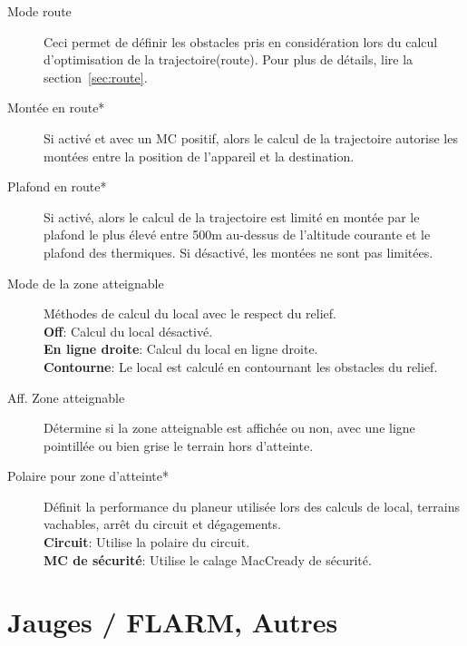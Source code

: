 \begin{description}
\item[Mode route]  \label{conf:routemode} Ceci permet de définir les obstacles pris en considération lors du calcul d'optimisation de la trajectoire(route). Pour plus de détails, lire la section~\ref{sec:route}.
\item[Montée en route*]  \label{conf:routeclimb} Si activé et avec un MC positif, alors le calcul de la trajectoire autorise les montées entre la position de l'appareil et la destination.
\item[Plafond en route*]  \label{conf:routeceiling} Si activé, alors le calcul de la trajectoire est limité en montée par le plafond le plus élevé entre 500m au-dessus de l'altitude courante et le plafond des thermiques. Si désactivé, les montées ne sont pas limitées.\\
\item[Mode de la zone atteignable]  \label{conf:turningreach} Méthodes de calcul du local avec le respect du relief.\\
  {\bf Off}: Calcul du local désactivé. \\
  {\bf En ligne droite}: Calcul du local en ligne droite. \\
  {\bf Contourne}: Le local est calculé en contournant les obstacles du relief.
\item[Aff. Zone atteignable]  \label{conf:gliderange} Détermine si la zone atteignable est affichée ou non, avec une ligne pointillée ou bien grise le terrain hors d'atteinte.
\item[Polaire pour zone d'atteinte*]  \label{conf:reachpolar} Définit la performance du planeur utilisée lors des calculs de local, terrains vachables, arrêt du circuit et dégagements. \\
  {\bf Circuit}: Utilise la polaire du circuit. \\
  {\bf MC de sécurité}: Utilise le calage MacCready de sécurité.
\end{description}


\section{Jauges / FLARM, Autres} \label{sec:flarmandother-gauge}

